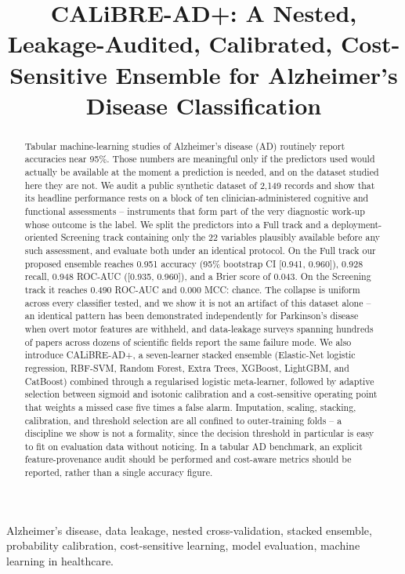 \documentclass[conference]{IEEEtran}
\begin{document}
\title{CALiBRE-AD+: A Nested, Leakage-Audited, Calibrated, Cost-Sensitive Ensemble for Alzheimer's Disease Classification}
\author{
}
\maketitle
\begin{abstract}
Tabular machine-learning studies of Alzheimer's disease (AD) routinely report accuracies near 95\%. Those numbers are meaningful only if the predictors used would actually be available at the moment a prediction is needed, and on the dataset studied here they are not. We audit a public synthetic dataset of 2{,}149 records and show that its headline performance rests on a block of ten clinician-administered cognitive and functional assessments -- instruments that form part of the very diagnostic work-up whose outcome is the label. We split the predictors into a Full track and a deployment-oriented Screening track containing only the 22 variables plausibly available before any such assessment, and evaluate both under an identical protocol. On the Full track our proposed ensemble reaches 0.951 accuracy (95\% bootstrap CI [0.941, 0.960]), 0.928 recall, 0.948 ROC-AUC ([0.935, 0.960]), and a Brier score of 0.043. On the Screening track it reaches 0.490 ROC-AUC and 0.000 MCC: chance. The collapse is uniform across every classifier tested, and we show it is not an artifact of this dataset alone -- an identical pattern has been demonstrated independently for Parkinson's disease when overt motor features are withheld, and data-leakage surveys spanning hundreds of papers across dozens of scientific fields report the same failure mode. We also introduce CALiBRE-AD+, a seven-learner stacked ensemble (Elastic-Net logistic regression, RBF-SVM, Random Forest, Extra Trees, XGBoost, LightGBM, and CatBoost) combined through a regularised logistic meta-learner, followed by adaptive selection between sigmoid and isotonic calibration and a cost-sensitive operating point that weights a missed case five times a false alarm. Imputation, scaling, stacking, calibration, and threshold selection are all confined to outer-training folds -- a discipline we show is not a formality, since the decision threshold in particular is easy to fit on evaluation data without noticing. In a tabular AD benchmark, an explicit feature-provenance audit should be performed and cost-aware metrics should be reported, rather than a single accuracy figure.
\end{abstract}
\begin{IEEEkeywords}
Alzheimer's disease, data leakage, nested cross-validation, stacked ensemble, probability calibration, cost-sensitive learning, model evaluation, machine learning in healthcare.
\end{IEEEkeywords}
\end{document}
